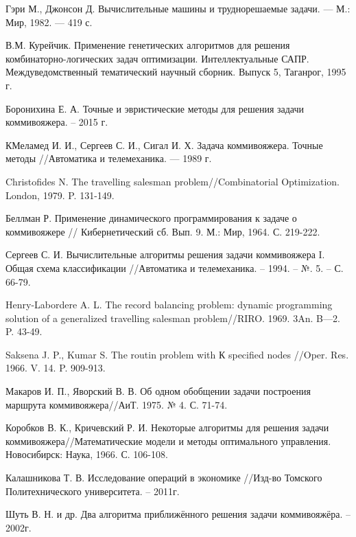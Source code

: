 
\renewcommand\bibname{СПИСОК ИСПОЛЬЗОВАННЫХ ИСТОЧНИКОВ}
\begin{thebibliography}{}

 Гэри М., Джонсон Д. Вычислительные машины и труднорешаемые задачи. --- М.: Мир, 1982. --- 419 с. 

 В.М. Курейчик. Применение генетических алгоритмов для решения
комбинаторно-логических задач оптимизации. Интеллектуальные САПР.
Междуведомственный тематический научный сборник. Выпуск 5, Таганрог, 1995 г.

 Боронихина Е. А. Точные и эвристические методы для решения задачи коммивояжера. – 2015 г.

 КМеламед И. И., Сергеев С. И., Сигал И. Х. Задача коммивояжера. Точные методы //Автоматика и телемеханика. --- 1989 г.

 Christofides N. The travelling salesman problem//Combinatorial Optimization. London, 1979. P. 131-149.

 Беллман Р. Применение динамического программирования к задаче о коммивояжере // Кибернетический сб. Вып. 9. М.: Мир, 1964. С. 219-222.

 Сергеев С. И. Вычислительные алгоритмы решения задачи коммивояжера I. Общая схема классификации //Автоматика и телемеханика. – 1994. – №. 5. – С. 66-79.

 Henry-Labordere A. L. The record balancing problem: dynamic programming solution of a generalized travelling salesman problem//RIRO. 1969. 3An. B—2. P.
43-49. 

 Saksena J. P., Kumar S. The routin problem with К specified nodes //Oper. Res.
1966. V. 14. P. 909-913.

 Макаров И. П., Яворский В. В. Об одном обобщении задачи построения маршрута
коммивояжера//АиТ. 1975. № 4. С. 71-74. 


 Коробков В. К., Кричевский Р. И. Некоторые алгоритмы для решения задачи
коммивояжера//Математические модели и методы оптимального управления.
Новосибирск: Наука, 1966. С. 106-108.

 Калашникова Т. В. Исследование операций в экономике //Изд-во Томского Политехнического университета. – 2011г.

 Шуть В. Н. и др. Два алгоритма приближённого решения задачи коммивояжёра. – 2002г.


\end{thebibliography}
